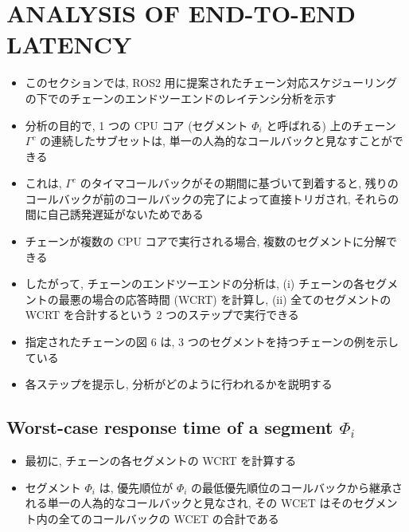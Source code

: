 
\section{ANALYSIS OF END-TO-END LATENCY}
\label{sec: analysis of end-to-end latency}

\begin{frame}{}
    \begin{itemize}
        \item このセクションでは, ROS2 用に提案されたチェーン対応スケジューリングの下でのチェーンのエンドツーエンドのレイテンシ分析を示す
        \item 分析の目的で, 1 つの CPU コア (セグメント $\Phi_{i}$ と呼ばれる) 上のチェーン $\Gamma^{c}$ の連続したサブセットは, 単一の人為的なコールバックと見なすことができる
        \item これは, $\Gamma^{c}$ のタイマコールバックがその期間に基づいて到着すると, 残りのコールバックが前のコールバックの完了によって直接トリガされ, それらの間に自己誘発遅延がないためである
        \item チェーンが複数の CPU コアで実行される場合, 複数のセグメントに分解できる
        \item したがって, チェーンのエンドツーエンドの分析は, (i) チェーンの各セグメントの最悪の場合の応答時間 (WCRT) を計算し, (ii) 全てのセグメントの WCRT を合計するという 2 つのステップで実行できる
        \item 指定されたチェーンの図 6 は, 3 つのセグメントを持つチェーンの例を示している
        \item 各ステップを提示し, 分析がどのように行われるかを説明する
    \end{itemize}
\end{frame}

\subsection{Worst-case response time of a segment $\Phi_{i}$}
\label{ssec: worst-case response time of a segment phi}

\begin{frame}{}
    \begin{itemize}
        \item 最初に, チェーンの各セグメントの WCRT を計算する
        \item セグメント $\Phi_{i}$ は, 優先順位が $\Phi_{i}$ の最低優先順位のコールバックから継承される単一の人為的なコールバックと見なされ, その WCET はそのセグメント内の全てのコールバックの WCET の合計である
    \end{itemize}
\end{frame}

